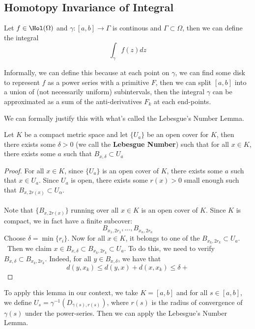 \documentclass{article}
\begin{document}
\subsection{Homotopy Invariance of Integral}

Let $f \in \Hol(\Omega)$ and $\gamma: [a, b] \to \Gamma$ is continous and $\Gamma \subset \Omega$, then we can define the integral
\[\int_\gamma f(z) dz\]

Informally, we can define this because at each point on $\gamma$, we can find some disk to represent $f$ as a power series with a primitive $F$, then we can split $[a, b]$ into a union of (not necessarily uniform) subintervals, then the integral $\gamma$ can be approximated as a sum of the anti-derivatives $F_k$ at each end-points.

We can formally justify this with what's called the Lebesgue's Number Lemma.

\begin{lemma}
Let $K$ be a compact metric space and let $\{U_a\}$ be an open cover for $K$, then there exists some $\delta > 0$ (we call the \textbf{Lebesgue Number}) such that for all $x \in K$, there exists some $a$ such that $B_{x, \delta} \subset U_a$
\end{lemma}

\begin{proof}
For all $x \in K$, since $\{U_a\}$ is an open cover of $K$, there exists some $a$ such that $x \in U_a$. Since $U_a$ is open, there exists some $r(x) > 0$ small enough such that $B_{x, 2r(x)} \subset U_\alpha$.\\\\
Note that $\{B_{x, 2r(x)}\}$ running over all $x \in K$ is an open cover of $K$. Since $K$ is compact, we in fact have a finite subcover:
\[B_{x_1,2r_1}, ..., B_{x_n, 2r_n}\]
Choose $\delta = \min \{r_i\}$. Now for all $x \in K$, it belongs to one of the $B_{x_k, 2r_k} \subset U_a$.\\\
Then we claim $x \in B_{x, \delta} \subset B_{x_k, 2r_k} \subset U_a$. To do this, we need to verify $B_{x, \delta} \subset B_{x_k, 2r_k}$. Indeed, for all $y \in B_{x, \delta}$, we have that
\[d(y, x_k) \leq d(y, x) + d(x, x_k) \leq \delta +  \]
\end{proof}

To apply this lemma in our context, we take $K = [a, b]$ and for all $s \in [a, b]$, we define $U_s = \gamma^{-1}(D_{\gamma(s), r(s)})$, where $r(s)$ is the radius of convergence of $\gamma(s)$ under the power-series. Then we can apply the Lebesgue's Number Lemma.
\end{document}

